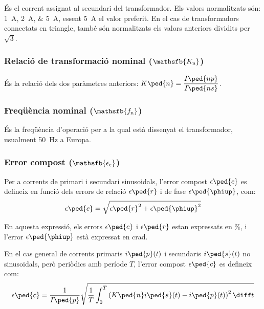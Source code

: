  És el corrent assignat al
secundari del transformador. Els valors normalitzats
són: \qtylist{1;2;5}{A}, essent \qty{5}{A} el valor preferit. En el cas de transformadors connectats en triangle, també són normalitzats els valors anteriors dividits per $ \sqrt{3}$.

\subsubsection{Relació de transformació nominal ($\mathsfb{K_\text{n}}$)}

És la relació dels dos  paràmetres anteriors: $K\ped{n} = \dfrac{I\ped{np}}{I\ped{ns}}$.

\subsubsection{Freqüència nominal ($\mathsfb{f_\text{n}}$)}

 És la freqüència d'operació per a la qual    està dissenyat el transformador, usualment \qty{50}{Hz} a Europa.

\subsubsection{Error compost ($\mathsfb{\epsilon_\text{c}}$)}

Per a corrents de primari i secundari sinusoidals, l'error compost $\epsilon\ped{c}$ es defineix  en funció dels errors de relació $\epsilon\ped{r}$ i de fase  $\epsilon\ped{\phiup}$, com:
\begin{equation}
    \epsilon\ped{c} = \sqrt{\epsilon\ped{r}^2 +  \epsilon\ped{\phiup}^2}
\end{equation}

En aquesta expressió, els errors $\epsilon\ped{c}$ i $\epsilon\ped{r}$  estan expressats en \si{\percent}, i l'error $\epsilon\ped{\phiup}$ està expressat en crad.

En el cas general de corrents primaris $i\ped{p}(t)$ i secundaris $i\ped{s}(t)$ no sinusoidals, però periòdics amb període $T$, l'error compost $\epsilon\ped{c}$ es defineix com:
\begin{equation}
    \epsilon\ped{c} = \frac{1}{I\ped{p}} \sqrt{\frac{1}{T} \int_0^T \left(K\ped{n} i\ped{s}(t) - i\ped{p}(t)\right)^2 \diff t}
\end{equation}


